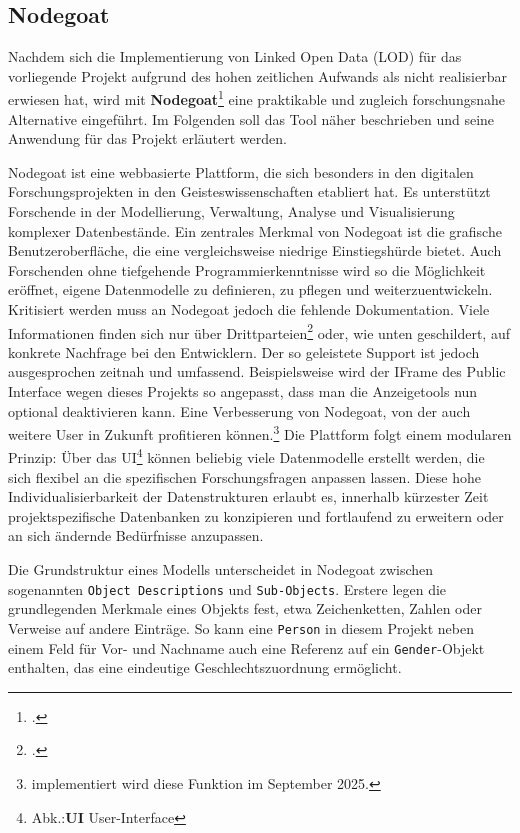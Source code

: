 \documentclass[12pt, a4paper, ngerman, bidi=default]{article}
\let\cite\footcite
\newcommand{\code}[1]{\colorbox{VeryLightGray}{\texttt{#1}}} %
\begin{document}
\subsection{Nodegoat}\label{subsec:Nodegoat_chapter}

Nachdem sich die Implementierung von Linked Open Data (LOD) für das vorliegende Projekt aufgrund des hohen zeitlichen 
Aufwands als nicht realisierbar erwiesen hat, wird mit \textbf{Nodegoat}\cite{kessels_Nodegoat_2013}
eine praktikable und zugleich forschungsnahe Alternative eingeführt. Im Folgenden soll das Tool näher beschrieben und seine Anwendung für das Projekt erläutert werden.

Nodegoat ist eine webbasierte Plattform, die sich besonders in den digitalen Forschungsprojekten in den Geisteswissenschaften etabliert hat. Es unterstützt Forschende in der Modellierung, 
Verwaltung, Analyse und Visualisierung komplexer Datenbestände. Ein zentrales Merkmal von Nodegoat ist die grafische Benutzeroberfläche, die eine vergleichsweise niedrige Einstiegshürde bietet. 
Auch Forschenden ohne tiefgehende Programmierkenntnisse wird so die Möglichkeit  eröffnet, eigene Datenmodelle zu definieren, zu pflegen und weiterzuentwickeln. Kritisiert werden muss an Nodegoat jedoch die fehlende Dokumentation. Viele Informationen finden sich nur über Drittparteien\cite[beispielsweise durch Schulungsunterlagen von Universitäten, 
hier besonders:\\][]{gubler_Nodegoat_nodate} oder, wie unten geschildert, auf konkrete Nachfrage bei den Entwicklern. Der so geleistete Support 
ist jedoch ausgesprochen zeitnah und umfassend. Beispielsweise wird der IFrame des Public Interface wegen dieses Projekts so angepasst, dass man die Anzeigetools nun optional deaktivieren kann. Eine Verbesserung von Nodegoat, von der auch weitere User in Zukunft profitieren können.\footnote{implementiert wird diese Funktion im September 2025.}
Die Plattform folgt einem modularen Prinzip: Über das UI\footnote{Abk.:\textbf{UI} User-Interface} können beliebig viele Datenmodelle 
erstellt werden, die sich flexibel an die spezifischen Forschungsfragen anpassen lassen. Diese hohe Individualisierbarkeit der Datenstrukturen erlaubt es, innerhalb kürzester Zeit projektspezifische 
Datenbanken zu konzipieren und fortlaufend zu erweitern oder an sich ändernde Bedürfnisse anzupassen.

Die Grundstruktur eines Modells unterscheidet in Nodegoat zwischen sogenannten \code{Object Descriptions} und \code{Sub-Objects}. 
Erstere legen die grundlegenden Merkmale eines Objekts fest, etwa Zeichenketten, Zahlen oder Verweise auf andere Einträge. 
So kann eine \code{Person} in diesem Projekt neben einem Feld für Vor- und Nachname auch eine Referenz auf ein \code{Gender}-Objekt enthalten, 
das eine eindeutige Geschlechtszuordnung ermöglicht.
\end{document}
